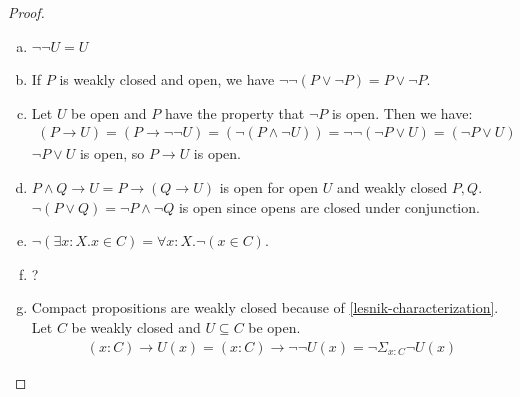 \begin{proof}
  \begin{enumerate}[(a)]
  \item \(\neg\neg U=U\)
  \item If \(P\) is weakly closed and open, we have \(\neg\neg(P\vee\neg P)=P\vee\neg P\).
  \item Let \(U\) be open and \(P\) have the property that \(\neg P\) is open.
    Then we have:
    \begin{align*}
      (P\to U) = (P\to\neg\neg U) = (\neg(P\wedge \neg U)) = \neg\neg (\neg P\vee U) = (\neg P\vee U)
    \end{align*}
    \(\neg P \vee U\) is open, so \(P\to U\) is open.
  \item \(P\wedge Q\to U = P\to (Q\to U)\) is open for open \(U\) and weakly closed \(P,Q\).
    \(\neg(P\vee Q)= \neg P \wedge \neg Q\) is open since opens are closed under conjunction.
  \item \(\neg(\exists x:X.x\in C)=\forall x:X.\neg (x\in C)\).
  \item ?
  \item Compact propositions are weakly closed because of \ref{lesnik-characterization}. Let \(C\) be weakly closed and \(U\subseteq C\) be open.
    \begin{align*}
      (x:C)\to U(x) = (x:C)\to \neg\neg U(x) = \neg \Sigma_{x:C}\neg U(x)
    \end{align*}
  \end{enumerate}
\end{proof}
